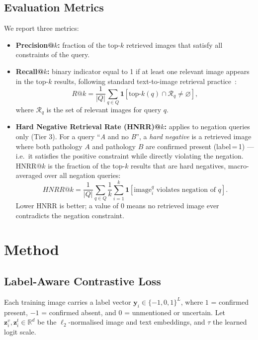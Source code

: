 \documentclass[10pt,twocolumn,letterpaper]{article}
\begin{document}
\subsection{Evaluation Metrics}
We report three metrics:
\begin{itemize}
    \item \textbf{Precision@$k$:} fraction of the top-$k$ retrieved images that satisfy all constraints of the query.

    \item \textbf{Recall@$k$:} binary indicator equal to 1 if at least one relevant image appears in the top-$k$ results, following standard text-to-image retrieval practice~\cite{radford2021learning}:
    \begin{equation}
        R@k = \frac{1}{|Q|}\sum_{q\in Q}\mathbf{1}\!\left[\mathrm{top\text{-}}k(q)\cap\mathcal{R}_q\neq\varnothing\right],
    \end{equation}
    where $\mathcal{R}_q$ is the set of relevant images for query $q$.

    \item \textbf{Hard Negative Retrieval Rate (HNRR)@$k$:} applies to negation queries only (Tier 3). For a query ``\textit{A} and no \textit{B}'', a \emph{hard negative} is a retrieved image where both pathology $A$ and pathology $B$ are confirmed present (label\,=\,1) — i.e.\ it satisfies the positive constraint while directly violating the negation. HNRR@$k$ is the fraction of the top-$k$ results that are hard negatives, macro-averaged over all negation queries:
    \begin{equation}
        HNRR@k = \frac{1}{|Q|}\sum_{q\in Q}\frac{1}{k}\sum_{i=1}^{k}\mathbf{1}[\text{image}_i^q \text{ violates negation of } q].
    \end{equation}
    Lower HNRR is better; a value of 0 means no retrieved image ever contradicts the negation constraint.
\end{itemize}




\section{Method}

\subsection{Label-Aware Contrastive Loss}

Each training image carries a label vector $\mathbf{y}_i \in \{-1,0,1\}^L$, where
$1$ = confirmed present, $-1$ = confirmed absent, and $0$ = unmentioned or uncertain.
Let $\mathbf{z}_i^v, \mathbf{z}_i^t\in\mathbb{R}^d$ be the $\ell_2$-normalised image
and text embeddings, and $\tau$ the learned logit scale.
\end{document}
